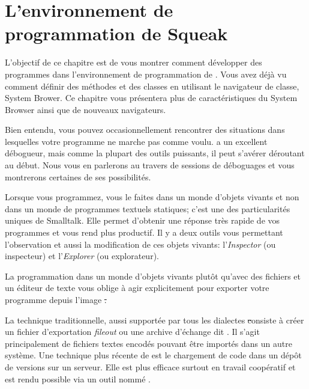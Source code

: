 \documentclass[a4paper,10pt,twoside]{book}
\begin{document}
	\renewcommand{\nnbb}[2]{} %
	\sloppy
\fi

\chapter{L'environnement de programmation de Squeak}
\label{cha:env}


L'objectif de ce chapitre est de vous montrer comment d\'evelopper des programmes dans l'environnement de programmation de \sq.
Vous avez d\'ej\`a vu comment d\'efinir des m\'ethodes et des classes
en utilisant le navigateur de classe, System Brower. Ce chapitre
vous pr\'esentera plus de caract\'eristiques du System Browser ainsi que
de nouveaux navigateurs.

Bien entendu, vous pouvez occasionnellement rencontrer
des situations dans lesquelles votre programme ne marche pas comme voulu.
\sq a un excellent d\'ebogueur, mais comme la plupart des outils puissants, il peut s'av\'erer d\'eroutant au d\'ebut.
Nous vous en parlerons au travers de sessions de d\'eboguages et vous
montrerons certaines de ses possibilit\'es.

Lorsque vous programmez, vous le faites dans un monde d'objets vivants et
non dans un monde de programmes textuels statiques; c'est 
une des particularit\'es uniques de Smalltalk.
Elle permet d'obtenir une r\'eponse tr\`es rapide de vos programmes et vous rend plus productif. Il y a deux outils vous permettant l'observation et aussi la modification de ces objets vivants: l'\emph{Inspector} (ou inspecteur) et l'\emph{Explorer} (ou explorateur).

La programmation dans un monde d'objets vivants plut\^ot qu'avec des fichiers et un \'editeur de texte vous oblige \`a agir explicitement pour exporter votre programme depuis l'image \st.

La technique traditionnelle, aussi support\'ee par tous les dialectes \st consiste \`a cr\'eer un fichier d'exportation \emph{fileout} ou une archive d'\'echange dit \changeset. Il s'agit principalement de fichiers textes encod\'es pouvant \^etre import\'es dans un autre syst\`eme.
Une technique plus r\'ecente de \sq est le chargement de code dans un d\'ep\^ot de versions sur un serveur.
Elle est plus efficace surtout en travail coop\'eratif et est rendu possible via un outil nomm\'e .
\end{document}
